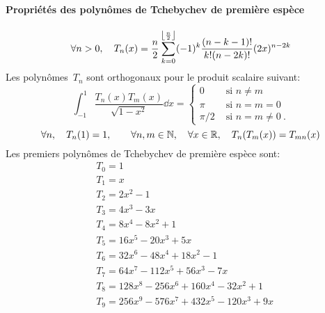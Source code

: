 \paragraph{Propriétés des polynômes de Tchebychev de première espèce} 
\begin{equation}
\forall n>0, \quad T_n(x)=\dfrac n2\displaystyle\sum_{k=0}^{\left\lfloor \frac n2\right\rfloor}(-1)^k \frac{(n-k-1)!}{k!(n-2k)!}(2x)^{n-2k} 
\end{equation}
Les polynômes~$T_n$ sont orthogonaux pour le produit scalaire suivant: 
\begin{equation}
 \int_{-1}^1 \frac{T_n(x)T_m(x)}{\sqrt{1-x^2}}\dd x= 
\begin{cases} 0&\text{ si } n\ne m\\ \pi&\text{ si } n=m=0\\ \pi/2&\text{ si } n=m\ne 0~. 
\end{cases} 
\end{equation}
\begin{equation}
\forall n, \quad T_n(1)=1,\qquad\forall n,m\in\mathbb N,\quad \forall x\in\mathbb R, \quad T_n(T_m(x))=T_{mn}(x) 
\end{equation}
Les premiers polynômes de Tchebychev de première espèce sont:
\begin{equation}
\begin{aligned}
&T_0 = 1 \\
&T_1 = x \\
&T_2 = 2x^2 - 1 \\
&T_3 = 4x^3 - 3x \\
& T_4 = 8x^4 - 8x^2 + 1 \\
& T_5 = 16x^5 - 20x^3 + 5x \\
& T_6 = 32x^6 - 48x^4 + 18x^2 - 1 \\
& T_7 = 64x^7 - 112x^5 + 56x^3 - 7x \\
& T_8 = 128x^8 - 256x^6 + 160x^4 - 32x^2 + 1 \\
&T_9 = 256x^9 - 576x^7 + 432x^5 - 120x^3 + 9x
\end{aligned}
\end{equation}
\medskipvm
